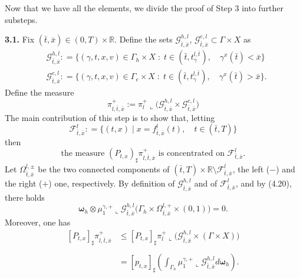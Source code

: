 \documentclass[11pt, twoside, reqno]{amsart}
\theoremstyle{definition}
\theoremstyle{remark}
\numberwithin{equation}{section}
\newcommand{\mc}[1]{\mathcal{#1}}
\newcommand{\bs}[1]{\boldsymbol{#1}}
\newcommand{\msc}[1]{\mathscr{#1}}
\begin{document}
Now that we have all the elements, we divide the proof of Step 3 into further substeps.

\vspace{0.5cm}
\textbf{3.1.} Fix $(\bar t, \bar x) \in (0, T) \times \mathbb R$. Define the sets $\mc G_{\bar t, \bar x}^{h,l}$, $ \mc G^{e,l}_{\bar t, \bar x} \subset \Gamma \times X$ as 
\begin{equation}
\begin{aligned}
    & \mc G^{h,l}_{\bar t, \bar x} : = \big\{(\gamma, t, x, v) \in \Gamma_h \times X  \; : \; t \in (\bar t, t^{l, \bar t}_{\gamma}), \quad \gamma^x(\bar t) < \bar x\big\} \\
& \mc G^{e,l}_{\bar t, \bar x} : = \big\{(\gamma, t, x, v) \in \Gamma_e \times X  \; : \; t \in (\bar t, t^{l, \bar t}_{\gamma}),  \quad \gamma^x(\bar t) > \bar x\big\} .
    \end{aligned}
\end{equation}
Define the measure 
$$
\pi^+_{l,\bar t, \bar x} := \pi^+_l \llcorner \big( \mc G^{h,l}_{\bar t, \bar x} \times \mc G^{e, l}_{\bar t, \bar x}\big)
$$
The main contribution of this step is to show that, letting 
$$\msc F_{\bar t, \bar x}^l : = \{(t,x) \; | \; x = f^l_{\bar t, \bar x}(t), \quad t \in (\bar t, T)\}$$
then
\begin{equation}\label{eq:step31}
    \text{the measure $(P_{t,x})_{\sharp}\pi^+_{l,\bar t, \bar x}$ is concentrated on $\msc F_{\bar t, \bar x}^l $}.
\end{equation}
Let $\Omega^{l,\pm}_{\bar t, \bar x}$ be the two connected components  of $(\bar t, T) \times \mathbb R \setminus \msc F^l_{\bar t, \bar x}$, the left ($-$) and the right ($+$) one, respectively. By definition of $\mc G^{h,l}_{\bar t, \bar x}$ and of $\msc F^l_{\bar t, \bar x}$, and by (4.20), there holds
\begin{equation}\label{eq:step311}
\bs \omega_h \otimes \mu_1^{\gamma,+}\llcorner \mc G^{h,l}_{\bar t, \bar x} \big( \Gamma_h \times \Omega^{l,+}_{\bar t, \bar x}\times (0, 1) \big) = 0.
\end{equation}
Moreover, one has 
\begin{equation}\label{eq:step312}
\begin{aligned}
    [P_{t,x}]_{\sharp}\pi^+_{l,\bar t, \bar x} &  \leq [P_{t,x}]_{\sharp}\pi^+_{l} \llcorner \big( \mc G^{h,l}_{\bar t, \bar x}  \times (\Gamma \times X)\big)\\
    & \\
    & = [p_{t, x}]_{\sharp} \left(  \int_{\Gamma_h} \mu_1^{\gamma,+}\llcorner \mc G^{h,l}_{\bar t, \bar x}   d \bs\omega_h  \right). \\
    \end{aligned}
\end{equation}
\end{document}
